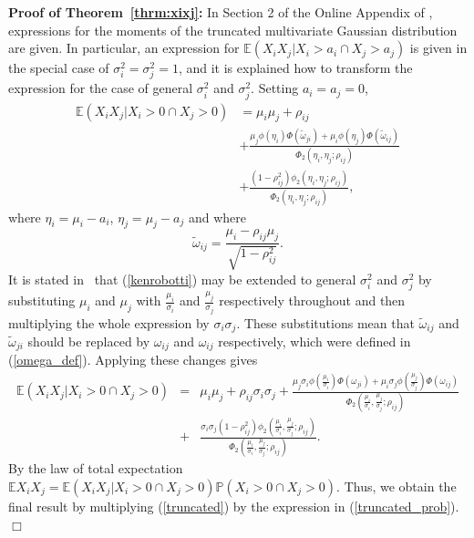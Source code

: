 \documentclass{article}
\begin{document}
\noindent \textbf{Proof of Theorem~\ref{thrm:xixj}:} In Section 2 of the Online Appendix of \cite{kan2017moments}, expressions for the moments of the truncated multivariate Gaussian distribution are given. In particular, an expression for $\mathbb{E} (X_i X_j | X_i > a_i \cap X_j > a_j )$ is given in the special case of $\sigma_i^2 = \sigma_j^2 = 1$, and it is explained how to transform the expression for the case of general $\sigma_i^2$ and $\sigma_j^2$. Setting $a_i = a_j = 0$,
\begin{equation}
\begin{split}
\mathbb{E}(X_i X_j | X_i > 0 \cap X_j > 0) & = \mu_i \mu_j + \rho_{ij}\\
& + \frac{\mu_j \phi(\eta_i) \Phi (\tilde{\omega}_{ji}) + \mu_i \phi (\eta_j) \Phi (\tilde{\omega}_{ij})}{\Phi_2 (\eta_i, \eta_j ; \rho_{ij})}\\
& + \frac{(1- \rho_{ij}^2) \phi_2 (\eta_i, \eta_j ; \rho_{ij})}{\Phi_2 ( \eta_i, \eta_j ; \rho_{ij})},
\end{split}
\label{kenrobotti}
\end{equation}
where $\eta_i = \mu_i - a_i$, $\eta_j = \mu_j - a_j$ and where 
$$\tilde{\omega}_{ij} = \frac{\mu_i - \rho_{ij} \mu_j}{\sqrt{1 - \rho_{ij}^2}}.$$
It is stated in~\cite{kan2017moments} that (\ref{kenrobotti}) may be extended to general $\sigma_i^2$ and $\sigma_j^2$ by substituting $\mu_i$ and $\mu_j$ with $\frac{\mu_i}{\sigma_i}$ and $\frac{\mu_j}{\sigma_j}$ respectively throughout and then multiplying the whole expression by $\sigma_i\sigma_j$. These substitutions mean that $\tilde{\omega}_{ij}$ and $\tilde{\omega}_{ji}$ should be replaced by $\omega_{ij}$ and $\omega_{ij}$ respectively, which were defined in (\ref{omega_def}). Applying these changes gives     
\begin{eqnarray}
\mathbb{E}(X_i X_j | X_i > 0 \cap X_j > 0) & =& \mu_i \mu_j + \rho_{ij} \sigma_i \sigma_j + \frac{\mu_j \sigma_i \phi \left( \frac{\mu_i}{\sigma_i} \right) \Phi (\omega_{ji}) + \mu_i \sigma_j \phi \left( \frac{\mu_j}{\sigma_j} \right) \Phi (\omega_{ij})}{\Phi_2 \left( \frac{\mu_i}{\sigma_i}, \frac{\mu_j}{\sigma_j} ; \rho_{ij} \right)}\nonumber\\
& + &\frac{\sigma_i \sigma_j(1-\rho_{ij}^2)\phi_2 \left( \frac{\mu_i}{\sigma_i}, \frac{\mu_j}{\sigma_j} ; \rho_{ij} \right)}{\Phi_2 \left( \frac{\mu_i}{\sigma_i}, \frac{\mu_j}{\sigma_j} ; \rho_{ij} \right)}.\label{truncated}
\end{eqnarray}
By the law of total expectation $\mathbb{E}X_i X_j = \mathbb{E}(X_i X_j | X_i > 0 \cap X_j > 0) \mathbb{P}(X_i > 0 \cap X_j > 0)$. Thus, we obtain the final result by multiplying (\ref{truncated}) by the expression in (\ref{truncated_prob}).
\hfill$\Box$
\end{document}
